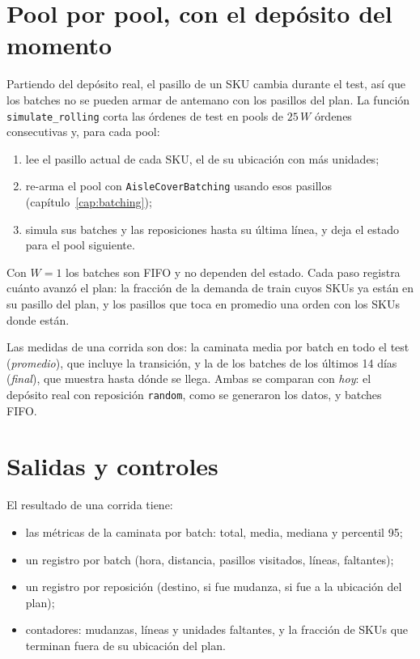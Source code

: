 \documentclass[11pt,a4paper,oneside]{report}
\newcommand{\code}[1]{\texttt{\small #1}}
\begin{document}
\section{Pool por pool, con el depósito del momento}
\label{sec:rolling}

Partiendo del depósito real, el pasillo de un SKU cambia durante el test, así que los batches
no se pueden armar de antemano con los pasillos del plan. La función \code{simulate\_rolling}
corta las órdenes de test en pools de $25\,W$ órdenes consecutivas y, para cada pool:

\begin{enumerate}
  \item lee el pasillo actual de cada SKU, el de su ubicación con más unidades;
  \item re-arma el pool con \code{AisleCoverBatching} usando esos pasillos
        (capítulo~\ref{cap:batching});
  \item simula sus batches y las reposiciones hasta su última línea, y deja el estado para el
        pool siguiente.
\end{enumerate}

Con $W = 1$ los batches son FIFO y no dependen del estado. Cada paso registra cuánto avanzó el
plan: la fracción de la demanda de train cuyos SKUs ya están en su pasillo del plan, y los
pasillos que toca en promedio una orden con los SKUs donde están.

Las medidas de una corrida son dos: la caminata media por batch en todo el test
(\emph{promedio}), que incluye la transición, y la de los batches de los últimos 14 días
(\emph{final}), que muestra hasta dónde se llega. Ambas se comparan con \emph{hoy}: el depósito
real con reposición \code{random}, como se generaron los datos, y batches FIFO.

\section{Salidas y controles}

El resultado de una corrida tiene:

\begin{itemize}
  \item las métricas de la caminata por batch: total, media, mediana y percentil 95;
  \item un registro por batch (hora, distancia, pasillos visitados, líneas, faltantes);
  \item un registro por reposición (destino, si fue mudanza, si fue a la ubicación del plan);
  \item contadores: mudanzas, líneas y unidades faltantes, y la fracción de SKUs que terminan
        fuera de su ubicación del plan.
\end{itemize}
\end{document}
